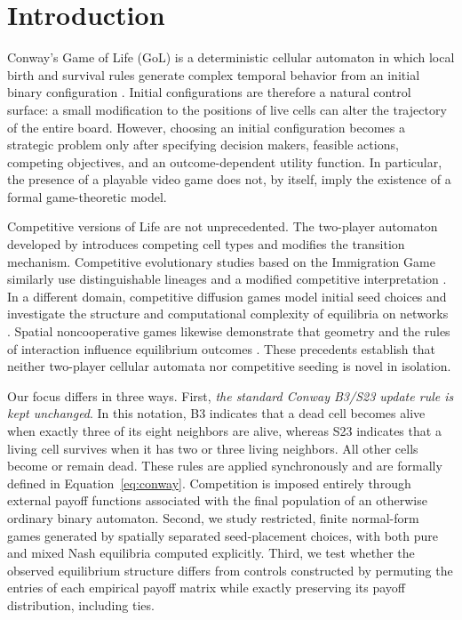 \documentclass[games,article,submit,moreauthors]{Definitions/mdpi}
\begin{document}
\section{Introduction}\label{sec:introduction}

Conway's Game of Life (GoL) is a deterministic cellular automaton in which local birth and survival rules generate complex temporal behavior from an initial binary configuration \citep{gardner1970,wolfram2002}. Initial configurations are therefore a natural control surface: a small modification to the positions of live cells can alter the trajectory of the entire board. However, choosing an initial configuration becomes a strategic problem only after specifying decision makers, feasible actions, competing objectives, and an outcome-dependent utility function. In particular, the presence of a playable video game does not, by itself, imply the existence of a formal game-theoretic model.

Competitive versions of Life are not unprecedented. The two-player automaton developed by \citet{levene2003} introduces competing cell types and modifies the transition mechanism. Competitive evolutionary studies based on the Immigration Game similarly use distinguishable lineages and a modified competitive interpretation \citep{turney2021}. In a different domain, competitive diffusion games model initial seed choices and investigate the structure and computational complexity of equilibria on networks \citep{etesami2016}. Spatial noncooperative games likewise demonstrate that geometry and the rules of interaction influence equilibrium outcomes \citep{andrade2009}. These precedents establish that neither two-player cellular automata nor competitive seeding is novel in isolation.

Our focus differs in three ways.
First, \emph{the standard Conway B3/S23 update rule is kept unchanged}.
In this notation, B3 indicates that a dead cell becomes alive when exactly three of its eight neighbors are alive, whereas S23 indicates that a living cell survives when it has two or three living neighbors. All other cells become or remain dead. These rules are applied synchronously and are formally defined in Equation~\eqref{eq:conway}. Competition is imposed entirely through external payoff functions associated with the final population of an otherwise ordinary binary automaton.
Second, we study restricted, finite normal-form games generated by spatially separated seed-placement choices, with both pure and mixed Nash equilibria computed explicitly.
Third, we test whether the observed equilibrium structure differs from controls constructed by permuting the entries of each empirical payoff matrix while exactly preserving its payoff distribution, including ties.
\end{document}
